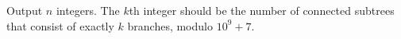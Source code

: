 
    Output $n$ integers.
    The $k$th integer should be the number of connected subtrees that consist of
    exactly $k$ branches, modulo $10^9+7$.

